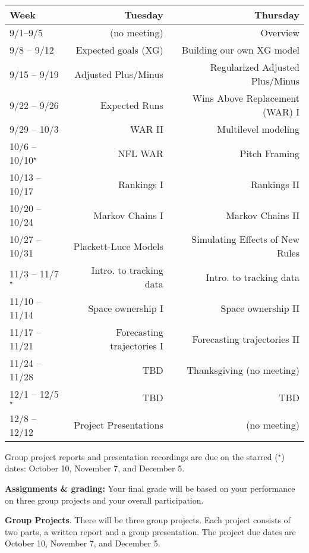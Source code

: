 \documentclass[11pt]{article}
\begin{document}
\begin{table}[h]
\centering
{\small
\begin{tabular}{lrr} \hline
Week & Tuesday & Thursday  \\ \hline
9/1--9/5 & (no meeting) & Overview  \\
9/8 -- 9/12 & Expected goals (XG) & Building our own XG model \\ 
9/15 -- 9/19 & Adjusted Plus/Minus & Regularized Adjusted Plus/Minus \\
9/22 -- 9/26 & Expected Runs & Wins Above Replacement (WAR) I \\
9/29 -- 10/3 & WAR II & Multilevel modeling  \\ %
10/6 -- 10/10$^{\star}$ & NFL WAR  & Pitch Framing  \\ 
10/13 -- 10/17 & Rankings I & Rankings II \\
10/20 -- 10/24 & Markov Chains I & Markov Chains II  \\  %
10/27 -- 10/31 & Plackett-Luce Models & Simulating Effects of New Rules \\ %
11/3 -- 11/7$^{\star}$ & Intro. to tracking data & Intro. to tracking data \\ %
11/10 -- 11/14 & Space ownership I & Space ownership II \\  %
11/17 -- 11/21 & Forecasting trajectories I & Forecasting trajectories II \\
11/24 -- 11/28 & TBD & Thanksgiving (no meeting) \\
12/1 -- 12/5$^{\star}$ & TBD & TBD  \\
12/8 -- 12/12 & Project Presentations & (no meeting) \\ \hline
\end{tabular}
}
\end{table}
Group project reports and presentation recordings are due on the starred ($^{\star}$) dates: October 10, November 7, and December 5.

\textbf{Assignments \& grading:} Your final grade will be based on your performance on three group projects and your overall participation.

\textbf{Group Projects}. There will be three group projects. Each project consists of two parts, a written report and a group presentation. The project due dates are October 10, November 7, and December 5.
\end{document}
